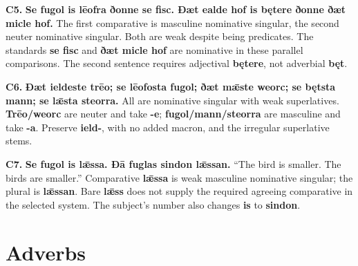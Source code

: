 \par\begin{minipage}{\linewidth}\raggedright
\textbf{C5.} \textbf{Se fugol is lēofra ðonne se fisc. Ðæt ealde hof is bętere ðonne ðæt micle hof.} The first comparative is masculine nominative singular, the second neuter nominative singular. Both are weak despite being predicates. The standards \textbf{se fisc} and \textbf{ðæt micle hof} are nominative in these parallel comparisons. The second sentence requires adjectival \textbf{bętere}, not adverbial \textbf{bęt}.

\end{minipage}\par\addvspace{4pt}

\par\begin{minipage}{\linewidth}\raggedright
\textbf{C6.} \textbf{Ðæt ieldeste trēo; se lēofosta fugol; ðæt mǣste weorc; se bętsta mann; se lǣsta steorra.} All are nominative singular with weak superlatives. \textbf{Trēo/\allowbreak{}weorc} are neuter and take \textbf{-e}; \textbf{fugol/\allowbreak{}mann/\allowbreak{}steorra} are masculine and take \textbf{-a}. Preserve \textbf{ield-}, with no added macron, and the irregular superlative stems.

\end{minipage}\par\addvspace{4pt}

\par\begin{minipage}{\linewidth}\raggedright
\textbf{C7.} \textbf{Se fugol is lǣssa. Ðā fuglas sindon lǣssan.} “The bird is smaller. The birds are smaller.” Comparative \textbf{lǣssa} is weak masculine nominative singular; the plural is \textbf{lǣssan}. Bare \textbf{lǣss} does not supply the required agreeing comparative in the selected system. The subject’s number also changes \textbf{is} to \textbf{sindon}.

\end{minipage}\par\addvspace{4pt}

\section*{Adverbs}

